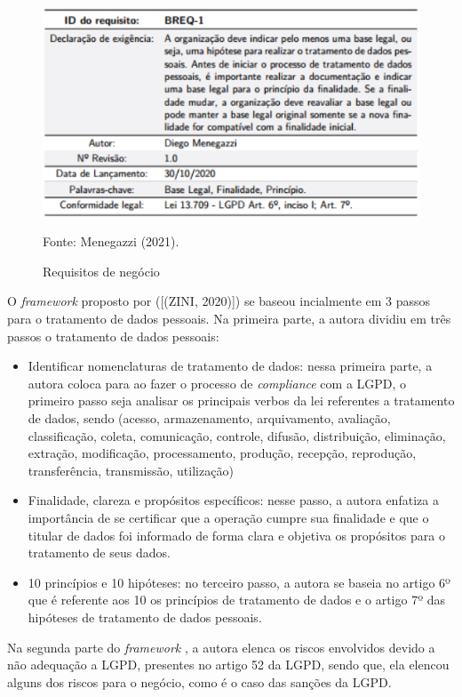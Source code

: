 \documentclass[
	12pt,				%
	openright,			%
	oneside,			%
	a4paper,			%
	english,			%
	french,				%
	spanish,			%
	brazil,				%
	]{abntex2}
\begin{document}
\begin{figure}[ht]
    \centering
    \caption{Requisitos de negócio}
    \includegraphics[width=5.0in]{Images/10Menegazzi.png}
    \label{fig: MenegazziB}
    
    \centering \small Fonte: Menegazzi (2021).
\end{figure}

O \textit{framework}  proposto por ([(ZINI, 2020)]) se baseou incialmente em 3 passos para o tratamento de dados pessoais. Na primeira parte, a autora dividiu em três passos o tratamento de dados pessoais:

\begin{itemize}
\item Identificar nomenclaturas de tratamento de dados: nessa primeira parte, a autora coloca para ao fazer o processo de \textit{compliance} com a LGPD, o primeiro passo seja analisar os principais verbos da lei referentes a tratamento de dados, sendo (acesso, armazenamento, arquivamento, avaliação, classificação, coleta, comunicação, controle, difusão, distribuição, eliminação, extração, modificação, processamento, produção, recepção, reprodução, transferência, transmissão, utilização)
\item Finalidade, clareza e propósitos específicos: nesse passo, a autora enfatiza a importância de se certificar que a operação cumpre sua finalidade e que o titular de dados foi informado de forma clara e objetiva os propósitos para o tratamento de seus dados.
\item 10 princípios e 10 hipóteses: no terceiro passo, a autora se baseia no artigo 6º que é referente aos 10 os princípios de tratamento de dados e o artigo 7º das hipóteses de tratamento de dados pessoais.
\end{itemize}

Na segunda parte do \textit{framework} , a autora elenca os riscos envolvidos devido a não adequação a LGPD, presentes no artigo 52 da LGPD, sendo que, ela elencou alguns dos riscos para o negócio, como é o caso das sanções da LGPD.
\end{document}
